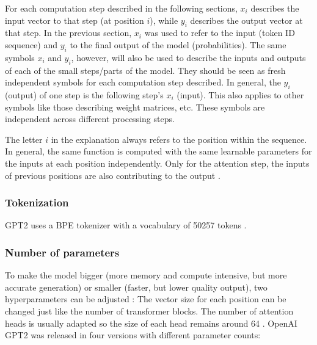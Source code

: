 For each computation step described in the following sections, $x_i$ describes the input vector to that step (at position $i$), while $y_i$ describes the output vector
at that step. In the previous section, $x_i$ was used to refer to the input (token ID sequence) and $y_i$ to the final output of the model (probabilities).
The same symbols $x_i$ and $y_i$, however, will also be used to describe the inputs and outputs of each of the small steps/parts of the model.
They should be seen as fresh independent symbols for each computation step described. In general, the $y_i$ (output) of one step is the following step's $x_i$ (input).
This also applies to other symbols like those describing weight matrices, etc. These symbols are independent across different processing steps.

The letter $i$ in the explanation always refers to the position within the sequence. In general, the same function is computed with the same learnable parameters
for the inputs at each position independently. Only for the attention step, the inputs of previous positions are also contributing to the output \cite{alammar-gpt2}.

\subsubsection{Tokenization}


\label{gpt2:tokenizer}

GPT2 uses a BPE tokenizer with a vocabulary of 50257 tokens  \cite{HuggingFaceGPT2}.

\subsubsection{Number of parameters}

\label{gpt2:parameters}

To make the model bigger (more memory and compute intensive, but more accurate generation) or smaller (faster, but lower quality output), two hyperparameters can be adjusted  : The vector size for each position can be changed just like the number of transformer blocks. The number of attention heads is usually adapted so the size of each head remains around 64  \cite{hfpretrained}.
OpenAI GPT2 was released in four versions with different parameter counts:

